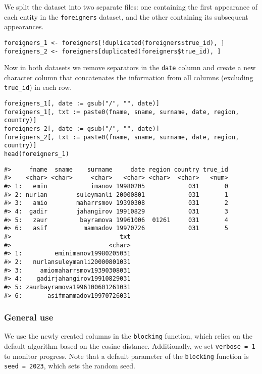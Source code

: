 We split the dataset into two separate files: one containing the first
appearance of each entity in the \texttt{foreigners} dataset, and the other
containing its subsequent appearances.

\begin{verbatim}
foreigners_1 <- foreigners[!duplicated(foreigners$true_id), ]
foreigners_2 <- foreigners[duplicated(foreigners$true_id), ]
\end{verbatim}

Now in both datasets we remove separators in the \texttt{date} column and create
a new character column that concatenates the information from all columns
(excluding \texttt{true\_id}) in each row.

\begin{verbatim}
foreigners_1[, date := gsub("/", "", date)]
foreigners_1[, txt := paste0(fname, sname, surname, date, region, country)]
foreigners_2[, date := gsub("/", "", date)]
foreigners_2[, txt := paste0(fname, sname, surname, date, region, country)]
head(foreigners_1)
\end{verbatim}

\begin{verbatim}
#>     fname  sname    surname     date region country true_id
#>    <char> <char>     <char>   <char> <char>  <char>   <num>
#> 1:   emin            imanov 19980205            031       0
#> 2: nurlan        suleymanli 20000801            031       1
#> 3:   amio        maharrsmov 19390308            031       2
#> 4:  gadir        jahangirov 19910829            031       3
#> 5:   zaur         bayramova 19961006  01261     031       4
#> 6:   asif          mammadov 19970726            031       5
#>                              txt
#>                           <char>
#> 1:         eminimanov19980205031
#> 2:   nurlansuleymanli20000801031
#> 3:     amiomaharrsmov19390308031
#> 4:    gadirjahangirov19910829031
#> 5: zaurbayramova1996100601261031
#> 6:       asifmammadov19970726031
\end{verbatim}

\subsubsection{General use}\label{general-use}

We use the newly created columns in the \texttt{blocking} function, which
relies on the default  algorithm based on the cosine distance.
Additionally, we set \texttt{verbose\ =\ 1}
to monitor progress. Note that a default parameter of the \texttt{blocking}
function is \texttt{seed\ =\ 2023}, which sets the random seed.

